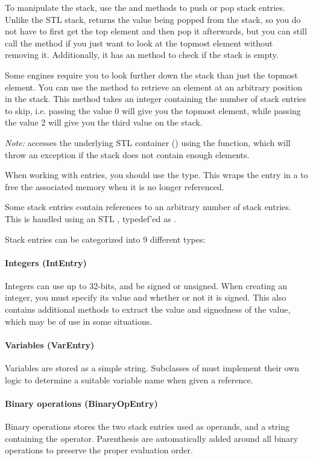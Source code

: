To manipulate the stack, use the  and  methods to push or pop stack entries. Unlike the STL stack,  returns the value being popped from the stack, so you do not have to first get the top element and then pop it afterwards, but you can still call the  method if you just want to look at the topmost element without removing it. Additionally, it has an  method to check if the stack is empty.

Some engines require you to look further down the stack than just the topmost element. You can use the  method to retrieve an element at an arbitrary position in the stack. This method takes an integer containing the number of stack entries to skip, i.e. passing the value 0 will give you the topmost element, while passing the value 2 will give you the third value on the stack.

\emph{Note:}  accesses the underlying STL container () using the  function, which will throw an exception if the stack does not contain enough elements.

When working with entries, you should use the  type. This wraps the entry in a  to free the associated memory when it is no longer referenced.

Some stack entries contain references to an arbitrary number of stack entries. This is handled using an STL , typedef'ed as .

Stack entries can be categorized into 9 different types:

\paragraph{Integers (IntEntry)}
Integers can use up to 32-bits, and be signed or unsigned. When creating an integer, you must specify its value and whether or not it is signed. This also contains additional methods to extract the value and signedness of the value, which may be of use in some situations.

\paragraph{Variables (VarEntry)}
Variables are stored as a simple string. Subclasses of  must implement their own logic to determine a suitable variable name when given a reference.

\paragraph{Binary operations (BinaryOpEntry)}
Binary operations stores the two stack entries used as operands, and a string containing the operator. Parenthesis are automatically added around all binary operations to preserve the proper evaluation order.

